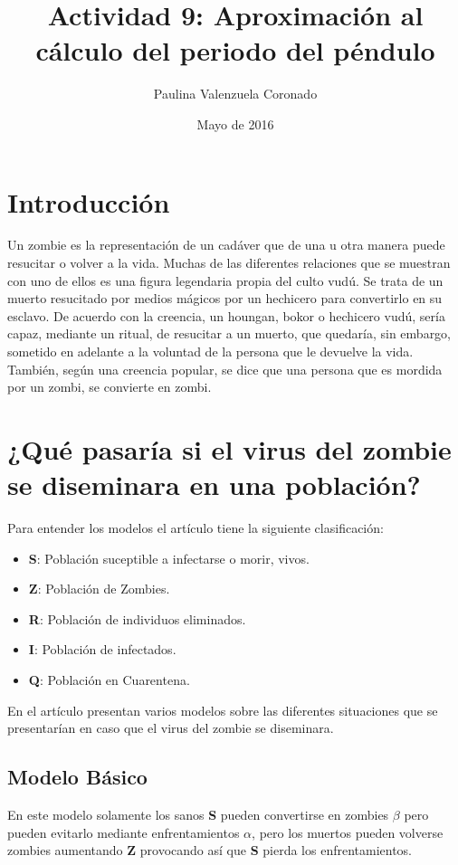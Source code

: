 \documentclass[12pt]{article}
\title{Actividad 9: Aproximación al cálculo del periodo del péndulo}
\author{Paulina Valenzuela Coronado}
\date{Mayo de 2016}
\begin{document}
\maketitle

\section{Introducción}
Un zombie es la representación de un cadáver que de una u otra manera puede resucitar o volver a la vida. Muchas de las diferentes relaciones que se muestran con uno de ellos es una figura legendaria propia del culto vudú. Se trata de un muerto resucitado por medios mágicos por un hechicero para convertirlo en su esclavo. De acuerdo con la creencia, un houngan, bokor o hechicero vudú, sería capaz, mediante un ritual, de resucitar a un muerto, que quedaría, sin embargo, sometido en adelante a la voluntad de la persona que le devuelve la vida. También, según una creencia popular, se dice que una persona que es mordida por un zombi, se convierte en zombi.\cite{U}

\section{¿Qué pasaría si el virus del zombie se diseminara en una población?}
Para entender los modelos el artículo  tiene la siguiente clasificación:
\begin{itemize}
	\item \textbf{S}: Población suceptible a infectarse o morir, vivos.
	\item \textbf{Z}: Población de Zombies.
	\item \textbf{R}: Población de individuos eliminados.
	\item \textbf{I}: Población de infectados.
	\item \textbf{Q}: Población en Cuarentena.
\end{itemize}

En el artículo presentan varios modelos sobre las diferentes situaciones que se presentarían en caso que el virus del zombie se diseminara.

\subsection{Modelo Básico}
En este modelo solamente los sanos \textbf{S} pueden convertirse en zombies \textit{$\beta$} pero pueden evitarlo mediante enfrentamientos \textit{$\alpha$}, pero los muertos pueden volverse zombies aumentando \textbf{Z}
provocando así que \textbf{S} pierda los enfrentamientos.
\end{document}
